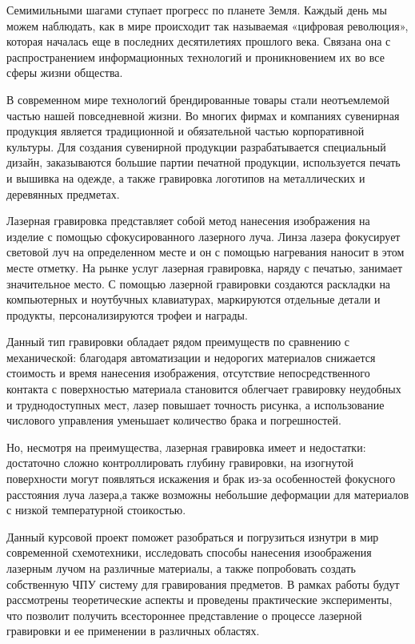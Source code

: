 \label{sec:intro}

Семимильными шагами ступает прогресс по планете Земля. Каждый день мы можем наблюдать,
как в мире происходит так называемая «цифровая революция», которая
началась еще в последних десятилетиях прошлого века. Связана она с распространением
информационных технологий и проникновением их во все сферы жизни общества.


В современном мире технологий брендированные товары стали неотъемлемой частью нашей повседневной жизни.
Во многих фирмах и компаниях сувенирная продукция является традиционной и обязательной частью 
корпоративной культуры. Для создания сувенирной продукции разрабатывается специальный дизайн, заказываются 
большие партии печатной продукции, используется печать и вышивка на одежде, а также гравировка логотипов 
на металлических и деревянных предметах.


Лазерная гравировка представляет собой метод нанесения изображения на изделие с помощью сфокусированного лазерного луча.
Линза лазера фокусирует световой луч на определенном месте и он с помощью нагревания наносит в этом месте отметку.
На рынке услуг лазерная гравировка, наряду с печатью, занимает значительное место. 
С помощью лазерной гравировки создаются раскладки на компьютерных и ноутбучных клавиатурах, 
маркируются отдельные детали и продукты, персонализируются трофеи и награды.


Данный тип гравировки обладает рядом преимуществ по сравнению с механической: благодаря автоматизации 
и недорогих материалов снижается стоимость и время нанесения изображения, отсутствие
непосредственного контакта с поверхностью материала становится облегчает гравировку неудобных и 
труднодоступных мест, лазер повышает точность рисунка, а использование числового управления уменьшает 
количество брака и погрешностей.


Но, несмотря на преимущества, лазерная гравировка имеет и недостатки: достаточно сложно контроллировать 
глубину гравировки, на изогнутой поверхности могут появляться искажения и брак из-за особенностей 
фокусного расстояния луча лазера,а также возможны небольшие деформации для материалов с низкой температурной 
стоикостью.


Данный курсовой проект поможет разобраться и погрузиться изнутри в мир современной схемотехники, 
исследовать способы нанесения изоображения лазерным лучом на различные материалы, а также попробовать
создать собственную ЧПУ систему для гравирования предметов. В рамках работы будут рассмотрены теоретические 
аспекты и проведены практические эксперименты, что позволит получить всестороннее представление о процессе 
лазерной гравировки и ее применении в различных областях.
